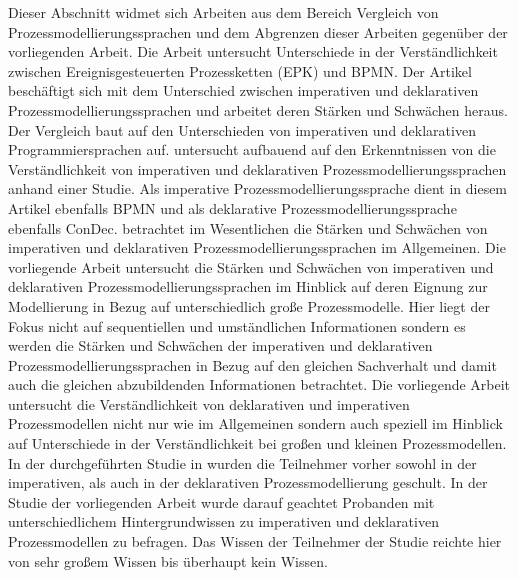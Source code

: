 Dieser Abschnitt widmet sich Arbeiten aus dem Bereich Vergleich von Prozessmodellierungssprachen und dem Abgrenzen dieser Arbeiten gegenüber der vorliegenden Arbeit.
Die Arbeit \cite{recker2007does} untersucht Unterschiede in der Verständlichkeit zwischen Ereignisgesteuerten Prozessketten (EPK) und BPMN.\newline
Der Artikel \cite{fahland2009} beschäftigt sich mit dem Unterschied zwischen imperativen und deklarativen Prozessmodellierungssprachen und arbeitet deren Stärken und Schwächen heraus. Der Vergleich baut auf den Unterschieden von imperativen und deklarativen Programmiersprachen auf. \newline
\cite{pichler2012} untersucht aufbauend auf den Erkenntnissen von  \cite{fahland2009} die Verständlichkeit von imperativen und deklarativen Prozessmodellierungssprachen anhand einer Studie. Als imperative Prozessmodellierungssprache dient in diesem Artikel ebenfalls BPMN und als deklarative Prozessmodellierungssprache ebenfalls ConDec. \newline 
\cite{fahland2009} betrachtet im Wesentlichen die Stärken und Schwächen von imperativen und deklarativen Prozessmodellierungssprachen im Allgemeinen. Die vorliegende Arbeit untersucht die Stärken und Schwächen von imperativen und deklarativen Prozessmodellierungssprachen im Hinblick auf deren Eignung zur Modellierung in Bezug auf unterschiedlich große Prozessmodelle. Hier liegt der Fokus nicht auf sequentiellen und umständlichen Informationen sondern es werden die Stärken und Schwächen der imperativen und deklarativen Prozessmodellierungssprachen in Bezug auf den gleichen Sachverhalt und damit auch die gleichen abzubildenden Informationen betrachtet.\newline
Die vorliegende Arbeit untersucht die Verständlichkeit von deklarativen und imperativen Prozessmodellen nicht nur wie \cite{pichler2012} im Allgemeinen sondern auch speziell im Hinblick auf Unterschiede in der Verständlichkeit bei großen und kleinen Prozessmodellen. In der durchgeführten Studie in \cite{pichler2012} wurden die Teilnehmer vorher sowohl in der imperativen, als auch in der deklarativen Prozessmodellierung geschult. In der Studie der vorliegenden Arbeit wurde darauf geachtet Probanden mit unterschiedlichem Hintergrundwissen zu imperativen und deklarativen Prozessmodellen zu befragen. Das Wissen der Teilnehmer der Studie reichte hier von sehr großem Wissen bis überhaupt kein Wissen.\newline

